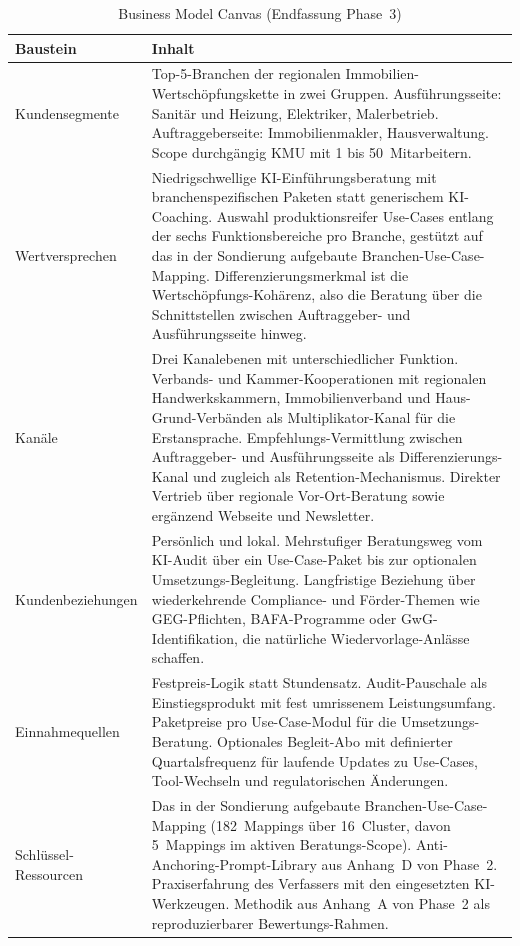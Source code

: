 \documentclass[a4paper,11pt]{article}
\begin{document}
\begin{table}[H]
\centering
\caption{Business Model Canvas (Endfassung Phase~3)}
\label{tab:bmc-final}
\small
\begin{tabular}{p{3.5cm}p{11cm}}
\toprule
\textbf{Baustein} & \textbf{Inhalt} \\
\midrule
Kundensegmente & Top-5-Branchen der regionalen Immobilien-Wertschöpfungs\-kette in zwei Gruppen. Ausführungsseite: Sanitär und Heizung, Elektriker, Malerbetrieb. Auftraggeberseite: Immobilienmakler, Hausverwaltung. Scope durchgängig KMU mit 1 bis 50~Mitarbeitern. \\
Wertversprechen & Niedrigschwellige KI-Einführungsberatung mit branchen\-spezifischen Paketen statt generischem KI-Coaching. Auswahl produktions\-reifer Use-Cases entlang der sechs Funktionsbereiche pro Branche, gestützt auf das in der Sondierung aufgebaute Branchen-Use-Case-Mapping. Differenzierungs\-merkmal ist die Wertschöpfungs-Kohärenz, also die Beratung über die Schnittstellen zwischen Auftraggeber- und Ausführungsseite hinweg. \\
Kanäle & Drei Kanal\-ebenen mit unterschiedlicher Funktion. Verbands- und Kammer-Kooperationen mit regionalen Handwerks\-kammern, Immobilien\-verband und Haus-Grund-Verbänden als Multiplikator-Kanal für die Erstansprache. Empfehlungs-Vermittlung zwischen Auftraggeber- und Ausführungsseite als Differenzierungs-Kanal und zugleich als Retention-Mechanismus. Direkter Vertrieb über regionale Vor-Ort-Beratung sowie ergänzend Webseite und Newsletter. \\
Kundenbeziehungen & Persönlich und lokal. Mehrstufiger Beratungsweg vom KI-Audit über ein Use-Case-Paket bis zur optionalen Umsetzungs-Begleitung. Langfristige Beziehung über wiederkehrende Compliance- und Förder-Themen wie GEG-Pflichten, BAFA-Programme oder GwG-Identifikation, die natürliche Wieder\-vorlage-Anlässe schaffen. \\
Einnahmequellen & Festpreis-Logik statt Stundensatz. Audit-Pauschale als Einstiegs\-produkt mit fest umrissenem Leistungs\-umfang. Paket\-preise pro Use-Case-Modul für die Umsetzungs-Beratung. Optionales Begleit-Abo mit definierter Quartals\-frequenz für laufende Updates zu Use-Cases, Tool-Wechseln und regulatorischen Änderungen. \\
Schlüssel-Ressourcen & Das in der Sondierung aufgebaute Branchen-Use-Case-Mapping (182~Mappings über 16~Cluster, davon 5~Mappings im aktiven Beratungs-Scope). Anti-Anchoring-Prompt-Library aus Anhang~D von Phase~2. Praxis\-erfahrung des Verfassers mit den eingesetzten KI-Werkzeugen. Methodik aus Anhang~A von Phase~2 als reproduzierbarer Bewertungs-Rahmen. \\

\end{tabular}
\end{table}
\end{document}

